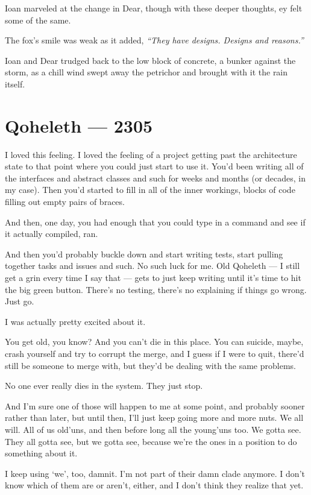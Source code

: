 Ioan marveled at the change in Dear, though with these deeper thoughts, ey felt some of the same.

The fox's smile was weak as it added, \emph{``They have designs. Designs and reasons.''}

Ioan and Dear trudged back to the low block of concrete, a bunker against the storm, as a chill wind swept away the petrichor and brought with it the rain itself.

\chapter*{Qoheleth — 2305}

I loved this feeling. I loved the feeling of a project getting past the architecture state to that point where you could just start to use it. You'd been writing all of the interfaces and abstract classes and such for weeks and months (or decades, in my case). Then you'd started to fill in all of the inner workings, blocks of code filling out empty pairs of braces.

And then, one day, you had enough that you could type in a command and see if it actually compiled, ran.

And then you'd probably buckle down and start writing tests, start pulling together tasks and issues and such. No such luck for me. Old Qoheleth --- I still get a grin every time I say that --- gets to just keep writing until it's time to hit the big green button. There's no testing, there's no explaining if things go wrong. Just go.

I was actually pretty excited about it.

You get old, you know? And you can't die in this place. You can suicide, maybe, crash yourself and try to corrupt the merge, and I guess if I were to quit, there'd still be someone to merge with, but they'd be dealing with the same problems.

No one ever really dies in the system. They just stop.

And I'm sure one of those will happen to me at some point, and probably sooner rather than later, but until then, I'll just keep going more and more nuts. We all will. All of us old'uns, and then before long all the young'uns too. We gotta see. They all gotta see, but we gotta see, because we're the ones in a position to do something about it.

I keep using `we', too, damnit. I'm not part of their damn clade anymore. I don't know which of them are or aren't, either, and I don't think they realize that yet.

